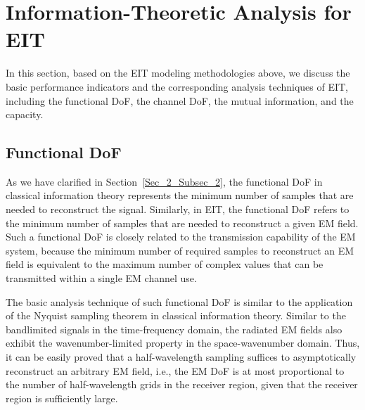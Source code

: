 \documentclass[journal,twocolumn]{IEEEtran}
\begin{document}
\section{Information-Theoretic Analysis for EIT}
In this section, based on the EIT modeling methodologies above, we discuss the basic performance indicators and the corresponding analysis techniques of EIT, including the functional DoF, the channel DoF, the mutual information, and the capacity. 


\subsection{Functional DoF}\label{Sec_4_Subsec_1}
As we have clarified in Section~\ref{Sec_2_Subsec_2}, the functional DoF in classical information theory represents the minimum number of samples that are needed to reconstruct the signal. Similarly, in EIT, the functional DoF refers to the minimum number of samples that are needed to reconstruct a given EM field. 
Such a functional DoF is closely related to the transmission capability of the EM system, because the minimum number of required samples to reconstruct an EM field is equivalent to the maximum number of complex values that can be transmitted within a single EM channel use. 

The basic analysis technique of such functional DoF is similar to the application of the Nyquist sampling theorem in classical information theory. 
Similar to the bandlimited signals in the time-frequency domain, the radiated EM fields also exhibit the wavenumber-limited property in the space-wavenumber domain. 
Thus, it can be easily proved that a half-wavelength sampling suffices to asymptotically reconstruct an arbitrary EM field, i.e., the EM DoF is at most proportional to the number of half-wavelength grids in the receiver region, given that the receiver region is sufficiently large. 
\end{document}
